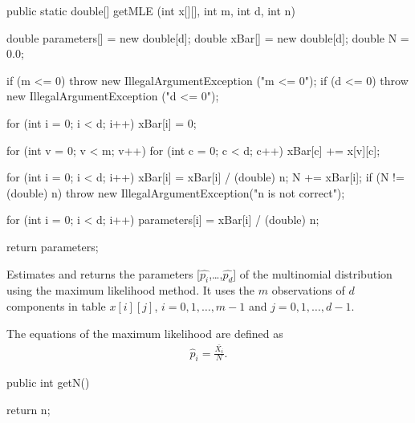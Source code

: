 \begin{code}

   public static double[] getMLE (int x[][], int m, int d, int n)\begin{hide} {
      double parameters[] = new double[d];
      double xBar[] = new double[d];
      double N = 0.0;

      if (m <= 0)
         throw new IllegalArgumentException ("m <= 0");
      if (d <= 0)
         throw new IllegalArgumentException ("d <= 0");

      for (int i = 0; i < d; i++)
         xBar[i] = 0;

      for (int v = 0; v < m; v++)
         for (int c = 0; c < d; c++)
            xBar[c] += x[v][c];

      for (int i = 0; i < d; i++)
      {
         xBar[i] = xBar[i] / (double) n;
         N += xBar[i];
      }
      if (N != (double) n)
         throw new IllegalArgumentException("n is not correct");

      for (int i = 0; i < d; i++)
         parameters[i] = xBar[i] / (double) n;

      return parameters;
   }\end{hide}
\end{code}
\begin{tabb}
   Estimates and returns the parameters [$\hat{p_i}$,\ldots,$\hat{p_d}$] of the
   multinomial distribution using the maximum likelihood method. It uses the $m$
   observations of $d$ components in table $x[i][j]$, $i = 0, 1, \ldots, m-1$
   and $j = 0, 1, \ldots, d-1$.
   \begin{detailed}%
   The equations of the maximum likelihood are defined as %
   \begin{eqnarray*}
      \hat p_i = \frac{\bar{X_i}}{N}.
   \end{eqnarray*}
   \end{detailed}%
\end{tabb}
\begin{htmlonly}
\end{htmlonly}
\begin{code}

   public int getN()\begin{hide} {
      return n;
   }\end{hide}
\end{code}
